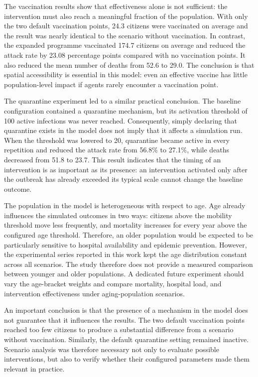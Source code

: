 \documentclass[english]{projectreport}
\begin{document}
The vaccination results show that effectiveness alone is not sufficient:
the intervention must also reach a meaningful fraction of the
population. With only the two default vaccination points, 24.3 citizens
were vaccinated on average and the result was nearly identical to the
scenario without vaccination. In contrast, the expanded programme
vaccinated 174.7 citizens on average and reduced the attack rate by
23.08 percentage points compared with no vaccination points. It also
reduced the mean number of deaths from 52.6 to 29.0. The conclusion is
that spatial accessibility is essential in this model: even an effective
vaccine has little population-level impact if agents rarely encounter a
vaccination point.

The quarantine experiment led to a similar practical conclusion. The
baseline configuration contained a quarantine mechanism, but its
activation threshold of 100 active infections was never reached.
Consequently, simply declaring that quarantine exists in the model does
not imply that it affects a simulation run. When the threshold was
lowered to 20, quarantine became active in every repetition and reduced
the attack rate from 56.8\% to 27.1\%, while deaths decreased from 51.8
to 23.7. This result indicates that the timing of an intervention is as
important as its presence: an intervention activated only after the
outbreak has already exceeded its typical scale cannot change the
baseline outcome.

The population in the model is heterogeneous with respect to age. Age
already influences the simulated outcomes in two ways: citizens above
the mobility threshold move less frequently, and mortality increases for
every year above the configured age threshold. Therefore, an older
population would be expected to be particularly sensitive to hospital
availability and epidemic prevention. However, the experimental series
reported in this work kept the age distribution constant across all
scenarios. The study therefore does not provide a measured comparison
between younger and older populations. A dedicated future experiment
should vary the age-bracket weights and compare mortality, hospital load,
and intervention effectiveness under aging-population scenarios.

An important conclusion is that the presence of a mechanism in the model
does not guarantee that it influences the results. The two default
vaccination points reached too few citizens to produce a substantial
difference from a scenario without vaccination. Similarly, the default
quarantine setting remained inactive. Scenario analysis was therefore
necessary not only to evaluate possible interventions, but also to verify
whether their configured parameters made them relevant in practice.
\end{document}
